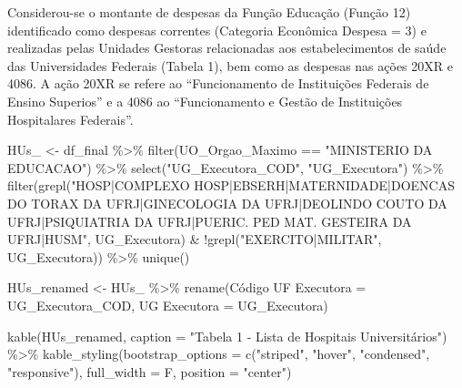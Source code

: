 \documentclass[
  letterpaper,
  DIV=11,
  numbers=noendperiod]{scrartcl}
\newenvironment{Shaded}{\begin{snugshade}}{\end{snugshade}}
\newcommand{\AttributeTok}[1]{\textcolor[rgb]{0.40,0.45,0.13}{#1}}
\newcommand{\FunctionTok}[1]{\textcolor[rgb]{0.28,0.35,0.67}{#1}}
\newcommand{\NormalTok}[1]{\textcolor[rgb]{0.00,0.23,0.31}{#1}}
\newcommand{\OtherTok}[1]{\textcolor[rgb]{0.00,0.23,0.31}{#1}}
\newcommand{\SpecialCharTok}[1]{\textcolor[rgb]{0.37,0.37,0.37}{#1}}
\newcommand{\StringTok}[1]{\textcolor[rgb]{0.13,0.47,0.30}{#1}}
\begin{document}
Considerou-se o montante de despesas da Função Educação (Função 12)
identificado como despesas correntes (Categoria Econômica Despesa = 3) e
realizadas pelas Unidades Gestoras relacionadas aos estabelecimentos de
saúde das Universidades Federais (Tabela 1), bem como as despesas nas
ações 20XR e 4086. A ação 20XR se refere ao ``Funcionamento de
Instituições Federais de Ensino Superios'' e a 4086 ao ``Funcionamento e
Gestão de Instituições Hospitalares Federais''.

\begin{Shaded}
\begin{Highlighting}[]
\NormalTok{HUs\_ }\OtherTok{\textless{}{-}}\NormalTok{ df\_final }\SpecialCharTok{\%\textgreater{}\%}
  \FunctionTok{filter}\NormalTok{(UO\_Orgao\_Maximo }\SpecialCharTok{==} \StringTok{"MINISTERIO DA EDUCACAO"}\NormalTok{) }\SpecialCharTok{\%\textgreater{}\%} 
  \FunctionTok{select}\NormalTok{(}\StringTok{"UG\_Executora\_COD"}\NormalTok{, }\StringTok{"UG\_Executora"}\NormalTok{) }\SpecialCharTok{\%\textgreater{}\%}
  \FunctionTok{filter}\NormalTok{(}\FunctionTok{grepl}\NormalTok{(}\StringTok{"HOSP|COMPLEXO HOSP|EBSERH|MATERNIDADE|DOENCAS DO TORAX DA UFRJ|GINECOLOGIA DA UFRJ|DEOLINDO COUTO DA UFRJ|PSIQUIATRIA DA UFRJ|PUERIC. PED MAT. GESTEIRA DA UFRJ|HUSM"}\NormalTok{, UG\_Executora) }\SpecialCharTok{\&} \SpecialCharTok{!}\FunctionTok{grepl}\NormalTok{(}\StringTok{"EXERCITO|MILITAR"}\NormalTok{, UG\_Executora)) }\SpecialCharTok{\%\textgreater{}\%}
  \FunctionTok{unique}\NormalTok{()}

\NormalTok{HUs\_renamed }\OtherTok{\textless{}{-}}\NormalTok{ HUs\_ }\SpecialCharTok{\%\textgreater{}\%} 
  \FunctionTok{rename}\NormalTok{(}\StringTok{\textquotesingle{}Código UF Executora\textquotesingle{}} \OtherTok{=}\NormalTok{ UG\_Executora\_COD, }\StringTok{\textquotesingle{}UG Executora\textquotesingle{}} \OtherTok{=}\NormalTok{ UG\_Executora)}

\FunctionTok{kable}\NormalTok{(HUs\_renamed, }\AttributeTok{caption =} \StringTok{"Tabela 1 {-} Lista de Hospitais Universitários"}\NormalTok{) }\SpecialCharTok{\%\textgreater{}\%}
  \FunctionTok{kable\_styling}\NormalTok{(}\AttributeTok{bootstrap\_options =} \FunctionTok{c}\NormalTok{(}\StringTok{"striped"}\NormalTok{, }\StringTok{"hover"}\NormalTok{, }\StringTok{"condensed"}\NormalTok{, }\StringTok{"responsive"}\NormalTok{), }
                \AttributeTok{full\_width =}\NormalTok{ F, }
                \AttributeTok{position =} \StringTok{"center"}\NormalTok{)}
\end{Highlighting}
\end{Shaded}
\end{document}
